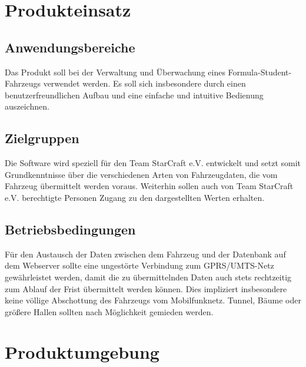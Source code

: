 \documentclass[fontsize = 12pt, paper = a4]{scrreprt}
\begin{document}

\chapter{Produkteinsatz}

\section{Anwendungsbereiche}

Das Produkt soll bei der Verwaltung und Überwachung eines Formula-Student-Fahrzeugs verwendet werden. Es soll sich insbesondere durch einen benutzerfreundlichen Aufbau und eine einfache und intuitive Bedienung auszeichnen.


\section{Zielgruppen}

Die Software wird speziell für den Team StarCraft e.V. entwickelt und setzt somit Grundkenntnisse über die verschiedenen Arten von Fahrzeugdaten, die vom Fahrzeug übermittelt werden voraus. Weiterhin sollen auch von Team StarCraft e.V. berechtigte Personen Zugang zu den dargestellten Werten erhalten.


\section{Betriebsbedingungen}

Für den Austausch der Daten zwischen dem Fahrzeug und der Datenbank auf dem Webserver sollte eine ungestörte Verbindung zum \gls{GPRS}/\gls{UMTS}-Netz gewährleistet werden, damit die zu übermittelnden Daten auch stets rechtzeitig zum Ablauf der Frist übermittelt werden können. Dies impliziert insbesondere keine völlige Abschottung des Fahrzeugs vom Mobilfunknetz. Tunnel, Bäume oder größere Hallen sollten nach Möglichkeit gemieden werden.



\chapter{Produktumgebung}
\end{document}
